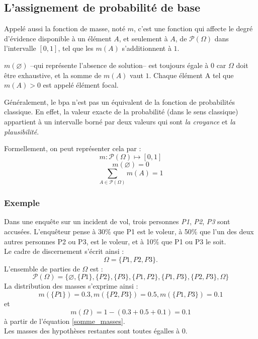 \subsection{L’assignement de probabilité de base}

Appelé aussi la fonction de masse, noté $m$, c'est une fonction qui affecte le degré d’évidence
disponible à un élément $A$, et seulement à $A$, de $\mathcal{P}(\Omega)$ dans l’intervalle
$[0,1]$, tel que les $m(A)$ s’additionnent à $1$.

$m(\varnothing)$ --qui représente l’absence
de solution-- est toujours égale à $0$ car $\Omega$ doit être exhaustive, et la somme de $m(A)$
vaut $1$. Chaque élément A tel que $m(A) > 0$ est appelé élément focal.

Généralement, le bpa n’est pas un équivalent de la fonction de probabilités classique. En effet,
la valeur exacte de la probabilité (dans le sens classique) appartient à un intervalle borné par
deux valeurs qui sont \emph{la croyance} et \emph{la plausibilité}.

Formellement, on peut représenter cela par :
\begin{equation}
m : \mathcal{P}(\Omega) \mapsto [0,1]
\end{equation}
\begin{equation}
m(\varnothing) = 0
\end{equation}
\begin{equation} \label{somme_masses}
\sum_{A \in \mathcal{P}(\Omega)} m(A) = 1
\end{equation}

\subsubsection{Exemple}
Dans une enquête sur un incident de vol, trois personnes \textit{P1}, \textit{P2}, \textit{P3}
sont accusées. L’enquêteur pense à 30\% que P1 est le voleur, à 50\% que l’un des deux autres
personnes P2 ou P3, est le voleur, et à 10\% que P1 ou P3 le soit.\\
Le cadre de discernement s'écrit ainsi : $$\Omega = \{P1, P2, P3\}.$$
L'ensemble de parties de $\Omega$ est : $$\mathcal{P}(\Omega) = \{\varnothing, \{P1\}, \{P2\},
\{P3\}, \{P1, P2\}, \{P1, P3\}, \{P2, P3\}, \Omega\}$$
La distribution des masses s'exprime ainsi : $$m(\{P1\}) = 0.3, m(\{P2, P3\})  = 0.5,
m(\{P1, P3\}) = 0.1$$ et $$m(\Omega) = 1 - (0.3+0.5+0.1) = 0.1$$ à partir de l’équation \ref{somme_masses}.\\
Les masses des hypothèses restantes sont toutes égalles à $0$.

